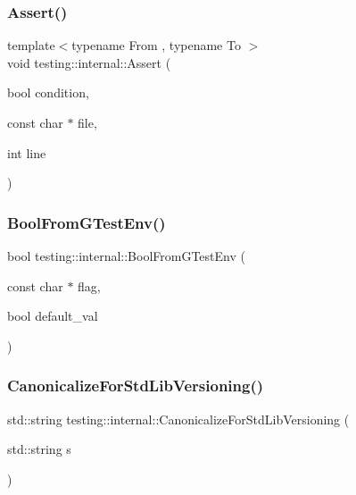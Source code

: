 \mbox{\label{namespacetesting_1_1internal_a7a259643b7f2d23ce2b757728df42c99}} 
\subsubsection{\texorpdfstring{Assert()}{Assert()}}
{\footnotesize\ttfamily template$<$typename From , typename To $>$ \\
void testing\+::internal\+::\+Assert (\begin{DoxyParamCaption}\item[{bool}]{condition,  }\item[{const char $\ast$}]{file,  }\item[{int}]{line }\end{DoxyParamCaption})\hspace{0.3cm}{\ttfamily [inline]}}

\mbox{\label{namespacetesting_1_1internal_a67132cdce23fb71b6c38ee34ef81eb4c}} 
\subsubsection{\texorpdfstring{BoolFromGTestEnv()}{BoolFromGTestEnv()}}
{\footnotesize\ttfamily bool testing\+::internal\+::\+Bool\+From\+G\+Test\+Env (\begin{DoxyParamCaption}\item[{const char $\ast$}]{flag,  }\item[{bool}]{default\+\_\+val }\end{DoxyParamCaption})}

\mbox{\label{namespacetesting_1_1internal_a5342e843f087081705094beae07b557b}} 
\subsubsection{\texorpdfstring{CanonicalizeForStdLibVersioning()}{CanonicalizeForStdLibVersioning()}}
{\footnotesize\ttfamily std\+::string testing\+::internal\+::\+Canonicalize\+For\+Std\+Lib\+Versioning (\begin{DoxyParamCaption}\item[{std\+::string}]{s }\end{DoxyParamCaption})\hspace{0.3cm}{\ttfamily [inline]}}

